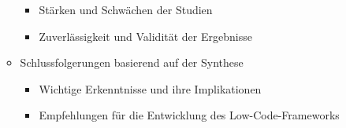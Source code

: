 \begin{itemize}
\begin{itemize}
\begin{itemize}
                    \item Stärken und Schwächen der Studien
                    \item Zuverlässigkeit und Validität der Ergebnisse
                \end{itemize}
            \item Schlussfolgerungen basierend auf der Synthese
                \begin{itemize}
                    \item Wichtige Erkenntnisse und ihre Implikationen
                    \item Empfehlungen für die Entwicklung des Low-Code-Frameworks
                \end{itemize}
        \end{itemize}
\end{itemize}

